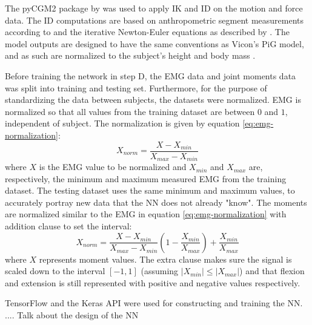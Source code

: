 \documentclass[../main.tex]{subfiles}
\begin{document}
The pyCGM2 package by \textcite{Leboeuf2019} was used to apply \ac{IK} and \ac{ID} on the motion and force data.
The \ac{ID} computations are based on anthropometric segment measurements according to \textcite{Dempster1955} and the iterative Newton-Euler equations as described by \textcite{Dumas2004}.
The model outputs are designed to have the same conventions as Vicon's \ac{PiG} model, and as such are normalized to the subject's height and body mass \cite{Leboeuf2019, viconpig}.

Before training the network in step D, the \ac{EMG} data and joint moments data was split into training and testing set.
Furthermore, for the purpose of standardizing the data between subjects, the datasets were normalized.
\ac{EMG} is normalized so that all values from the training dataset are between $0$ and $1$, independent of subject.
The normalization is given by equation \ref{eq:emg-normalization}:
\begin{equation}
\label{eq:emg-normalization}
    X_{norm} = \frac{X - X_{min}}{X_{max} - X_{min}}
\end{equation}
where $X$ is the \ac{EMG} value to be normalized and $X_{min}$ and $X_{max}$ are, respectively, the minimum and maximum measured \ac{EMG} from the training dataset. 
The testing dataset uses the same minimum and maximum values, to accurately portray new data that the \ac{NN} does not already "know".
The moments are normalized similar to the \ac{EMG} in equation \ref{eq:emg-normalization} with addition clause to set the interval:
\begin{equation}
\label{eq:moment-normalization}
    X_{norm} = \frac{X - X_{min}}{X_{max} - X_{min}}\left(1 - \frac{X_{min}}{X_{max}}\right) + \frac{X_{min}}{X_{max}}
\end{equation}
where $X$ represents moment values. 
The extra clause makes sure the signal is scaled down to the interval $[-1,1]$ (assuming $\left|X_{min}\right| \leq \left|X_{max}\right|$) and that flexion and extension is still represented with positive and negative values respectively.

TensorFlow \cite{tensorflow2015-whitepaper} and the Keras API \cite{chollet2015keras} were used for constructing and training the \ac{NN}.
.... Talk about the design of the \ac{NN}

\end{document}
